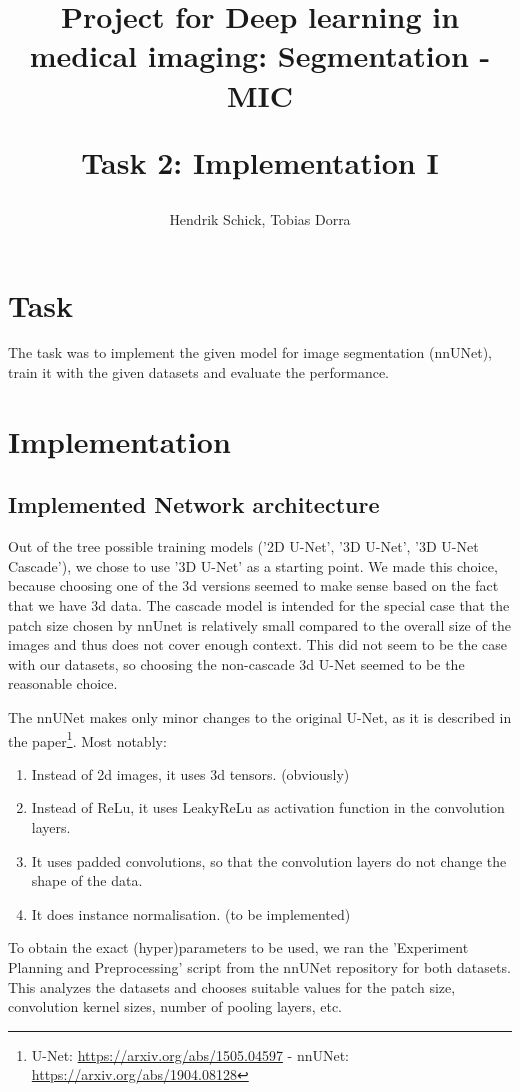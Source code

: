 \documentclass{article}
\author{Hendrik Schick, Tobias Dorra}
\title{Project for Deep learning in medical imaging: Segmentation - MIC \\ \begin{large} 
Task 2: Implementation I
\end{large}}
\begin{document}
	
	\maketitle

	\section{Task}

		The task was to implement the given model for image segmentation (nnUNet), train it with the given datasets and evaluate the performance.

	\section{Implementation}

		\subsection{Implemented Network architecture}

			Out of the tree possible training models ('2D U-Net', '3D U-Net', '3D U-Net Cascade'), we chose to use '3D U-Net' as a starting point. We made this choice, because choosing one of the 3d versions seemed to make sense based on the fact that we have 3d data. The cascade model is intended for the special case that the patch size chosen by nnUnet is relatively small compared to the overall size of the images and thus does not cover enough context. This did not seem to be the case with our datasets, so choosing the non-cascade 3d U-Net seemed to be the reasonable choice.

			The nnUNet makes only minor changes to the original U-Net, as it is described in the paper\footnote{U-Net: \url{https://arxiv.org/abs/1505.04597} - nnUNet: \url{https://arxiv.org/abs/1904.08128}}. Most notably:
			\begin{enumerate}
				\item Instead of 2d images, it uses 3d tensors. (obviously)
				\item Instead of ReLu, it uses LeakyReLu as activation function in the convolution layers.
				\item It uses padded convolutions, so that the convolution layers do not change the shape of the data.
				\item It does instance normalisation. (to be implemented)
			\end{enumerate}

			To obtain the exact (hyper)parameters to be used, we ran the 'Experiment Planning and Preprocessing' script from the nnUNet repository for both datasets. This analyzes the datasets and chooses suitable values for the patch size, convolution kernel sizes, number of pooling layers, etc.
\end{document}
